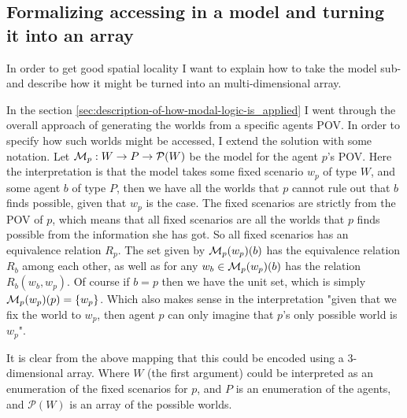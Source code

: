 \subsection{Formalizing accessing in a model and turning it into an array} \label{sec:model-access}
In order to get good spatial locality I want to explain how to take the model sub-\SfiveN{} and describe how it might be turned into an multi-dimensional array.

In the section \ref{sec:description-of-how-modal-logic-is_applied} I went through the overall approach of generating the worlds from a specific agents POV. In order to specify how such worlds might be accessed, I extend the solution with some notation. Let $\mathcal{M}_p: W \rightarrow P \rightarrow \mathcal{P}(W)$ be the model for the agent $p$'s POV. Here the interpretation is that the model takes some fixed scenario $w_p$ of type $W$, and some agent $b$ of type $P$, then we have all the worlds that $p$ cannot rule out that $b$ finds possible, given that $w_p$ is the case.  
The fixed scenarios are strictly from the POV of $p$, which means that all fixed scenarios are all the worlds that $p$ finds possible from the information she has got. So all fixed scenarios has an equivalence relation $R_p$. The set given by $\mathcal{M}_p(w_p)(b)$ has the equivalence relation $R_b$ among each other, as well as for any $w_b \in \mathcal{M}_p(w_p)(b)$ has the relation $R_b(w_b,w_p)$. Of course if $b=p$ then we have the unit set, which is simply $\mathcal{M}_p(w_p)(p) = \{w_p\}$. Which also makes sense in the interpretation "given that we fix the world to $w_p$, then agent $p$ can only imagine that $p$'s only possible world is $w_p$". 

It is clear from the above mapping that this could be encoded using a 3-dimensional array. Where $W$ (the first argument) could be interpreted as an enumeration of the fixed scenarios for $p$, and $P$ is an enumeration of the agents, and $\mathcal{P}(W)$ is an array of the possible worlds.




